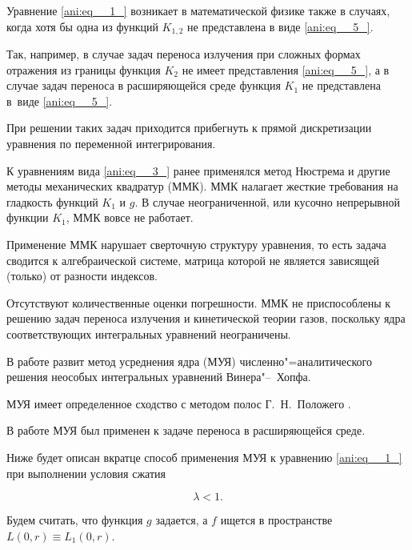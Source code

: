 
Уравнение \eqref{ani:eq__1_} возникает в математической физике также в случаях, когда хотя бы одна из  функций $K_{1,2} $  не представлена в виде  \eqref{ani:eq__5_}. 

Так, например, в случае задач  переноса излучения при сложных формах отражения из границы функция $K_{2} $ не имеет  представления \eqref{ani:eq__5_}, а в случае задач переноса в расширяющейся среде функция $K_{1} $ не  представлена в~виде \eqref{ani:eq__5_}.  

При решении таких задач  приходится прибегнуть к прямой дискретизации уравнения по переменной интегрирования.



К уравнениям вида \eqref{ani:eq__3_} ранее применялся метод Нюстрема и другие  методы механических квадратур (ММК). ММК налагает жесткие требования на гладкость функций $K_1$ и $g$. В случае неограниченной, или кусочно непрерывной функции $K_1$, ММК вовсе не работает. 

Применение ММК нарушает сверточную структуру уравнения, то есть задача сводится к алгебраической системе, матрица которой не является зависящей (только) от разности индексов. 

Отсутствуют количественные оценки погрешности. ММК не приспособлены к решению задач переноса излучения и кинетической теории газов, поскольку ядра соответствующих интегральных уравнений   неограничены.



В работе \cite{ani:EnB} развит метод усреднения ядра (МУЯ) численно"=аналитического решения неособых интегральных уравнений Винера"--~Хопфа. 

МУЯ имеет определенное сходство  с методом  полос  Г.~Н.~Положего \cite{ani:add-1:ru}.

В работе \cite{ani:Astr} МУЯ был применен к задаче  переноса в расширяющейся среде.



Ниже будет описан вкратце способ применения МУЯ к уравнению \eqref{ani:eq__1_} при выполнении условия сжатия

\begin{equation} \label{ani:eq__7_} 

\lambda <1.

\end{equation}

Будем считать, что функция $g$ задается, а $f$  ищется в пространстве $L(0, r)\equiv L_1(0, r)$.



